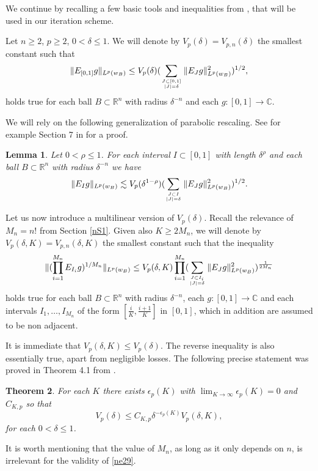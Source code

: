 \documentclass[amssymb,amsfonts,12pt]{amsart}
\newtheorem{theorem}{Theorem}[section]
\newtheorem{lemma}[theorem]{Lemma}
\def\R{{\mathbb R}}
\def\C{{\mathbb C}}
\begin{document}
\bigskip

We continue by  recalling a few basic tools and inequalities from \cite{BD4}, that will be used in our iteration scheme.


Let $n\ge 2$, $p\ge 2$, $0<\delta\le 1$. We will denote by $V_p(\delta)=V_{p,n}(\delta)$ the smallest constant such that
$$\|E_{[0,1]}g\|_{L^p(w_B)}\le V_p(\delta)(\sum_{J\subset [0,1]\atop{|J|=\delta}}\|E_Jg\|_{L^p(w_B)}^2)^{1/2},$$
holds true for each ball $B\subset \R^n$ with radius $\delta^{-n}$ and each $g:[0,1]\to\C$.
\bigskip

We will rely on the following generalization of parabolic rescaling. See for example Section 7 in \cite{BD6} for a proof.
\begin{lemma}
Let $0<\rho\le 1$.
For each interval $I\subset [0,1]$ with length $\delta^{\rho}$  and each ball $B\subset \R^n$ with radius $\delta^{-n}$ we have
\begin{equation}
\label{ne31}
\|E_Ig\|_{L^p(w_B)}\lesssim V_p(\delta^{1-\rho})(\sum_{J\subset I\atop{|J|=\delta}}\|E_Jg\|_{L^p(w_{B})}^2)^{1/2}.
\end{equation}
\end{lemma}



 Let us now introduce a multilinear version of $V_p(\delta)$. Recall the relevance of $M_n=n!$ from Section \ref{nS1}.  Given also $K\ge 2M_n$, we will denote by $V_p(\delta,K)=V_{p,n}(\delta,K)$ the smallest constant such that the inequality
$$\|(\prod_{i=1}^{M_n}E_{I_i}g)^{1/M_n}\|_{L^p(w_B)}\le V_p(\delta,K)\prod_{i=1}^{M_n}(\sum_{J\subset I_i\atop{|J|=\delta}}\|E_Jg\|_{L^p(w_B)}^2)^{\frac1{2M_n}}$$
holds true for each ball $B\subset \R^n$ with radius $\delta^{-n}$, each $g:[0,1]\to\C$ and each intervals
$I_1,\ldots,I_{M_n}$  of the form $[\frac{i}{K},\frac{i+1}{K}]$ in $[0,1]$, which in addition are assumed to be non adjacent.
\bigskip

It is immediate that $V_p(\delta,K)\le V_p(\delta)$. The reverse inequality is also essentially true, apart from negligible losses. The following precise statement was proved in Theorem 4.1 from \cite{BD4}.
\begin{theorem}
For each $K$ there exists $\epsilon_p(K)$ with $\lim_{K\to\infty}\epsilon_p(K)=0$ and $C_{K,p}$ so that
\begin{equation}
\label{ne29}
V_p(\delta)\le C_{K,p}\delta^{-\epsilon_p(K)}V_p(\delta,K),
\end{equation}
for each $0<\delta\le 1$.
\end{theorem}
It is worth mentioning that the value of $M_n$, as long as it only depends  on $n$, is irrelevant for the validity of \eqref{ne29}.
\bigskip
\end{document}
